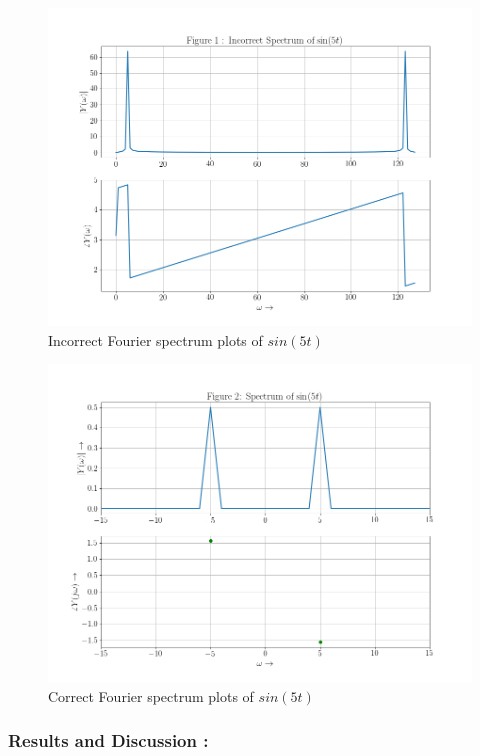 \documentclass[11pt, a4paper]{article}
\begin{document}
\begin{figure}[!tbh]
    \includegraphics[scale=0.5]{./../Extras/fig9-1.png}  %
    \caption{Incorrect Fourier spectrum plots of $sin(5t)$}
  \end{figure}
\newpage
\begin{figure}[!tbh]
  \includegraphics[scale=0.5]{./../Extras/fig9-2.png}  %
  \caption{Correct Fourier spectrum plots of $sin(5t)$}
\end{figure}
\newpage
\subsubsection{Results and Discussion :}\label{results-and-discussion}
\end{document}
